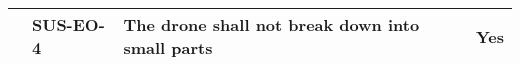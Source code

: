 \begin{table}[H]
\begin{scriptsize}
\begin{tabular}{|p{1cm}|p{1.5cm}|p{10cm}|p{3cm}|}
                          & SUS-EO-4      & The drone shall not break down into small parts & \cellcolor[HTML]{C1FFC1}Yes                                                                              \\\hline
\end{tabular}%

\end{scriptsize}
\end{table}